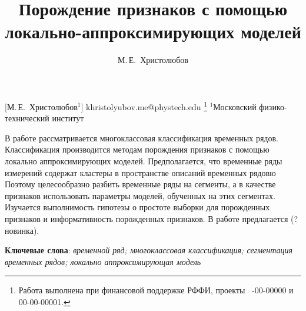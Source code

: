 \documentclass[12pt, twoside]{article}
\begin{document}
\title
    [Порождение признаков с помощью локально-аппроксимирующих моделей] %
    {Порождение признаков с помощью локально-аппроксимирующих моделей}
\author
    [М.\,Е.~Христолюбов] %
    {М.\,Е.~Христолюбов} %
    [М.\,Е.~Христолюбов$^1$] %
\email
    {khristolyubov.me@phystech.edu}
\thanks
    {Работа выполнена при
     финансовой поддержке РФФИ, проекты \No\ -00-00000 и 00-00-00001.}
\organization
    {$^1$Московский физико-технический институт}
\abstract
    {В работе рассматривается многоклассовая классификация временных рядов. Классификация производится методам порождения признаков с помощью локально аппроксимирующих моделей. Предполагается, что временные ряды измерений содержат кластеры в пространстве описаний временных рядовю Поэтому целесообразно разбить временные ряды на сегменты, а в качестве признаков использовать параметры моделей, обученных на этих сегментах. Изучается выполнимость гипотезы о простоте выборки для порожденных признаков и информативность порожденных признаков. В работе предлагается (?новинка).
	
\bigskip
\noindent
\textbf{Ключевые слова}: \emph {временной ряд; многоклассовая классификация; сегментация временных рядов; локально аппроксимирующая модель}
}
\end{document}
